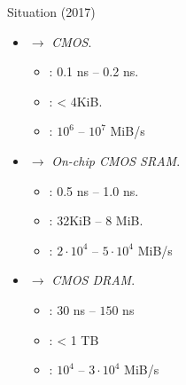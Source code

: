 \begin{frame}[t]{Situation (2017)}
\begin{itemize}
  \item {} $\rightarrow$ \emph{CMOS}.
    \begin{itemize}
      \item {}: 0.1 ns -- 0.2 ns.
      \item {}: < 4KiB.
      \item {}: $10^6$ -- $10^7$ MiB/s
    \end{itemize}

  \item {} $\rightarrow$ \emph{On-chip CMOS SRAM}.
    \begin{itemize}
      \item {}: 0.5 ns -- 1.0 ns.
      \item {}: 32KiB -- 8 MiB.
      \item {}: $2 \cdot 10^4$ -- $5 \cdot 10^4$ MiB/s 
    \end{itemize}

  \item {} $\rightarrow$ \emph{CMOS DRAM}.
    \begin{itemize}
      \item {}: $30$ ns -- $150$ ns
      \item {}: < 1 TB
      \item {}: $10^4$ -- $3 \cdot 10^4$ MiB/s 
    \end{itemize}

\end{itemize}
\end{frame}

